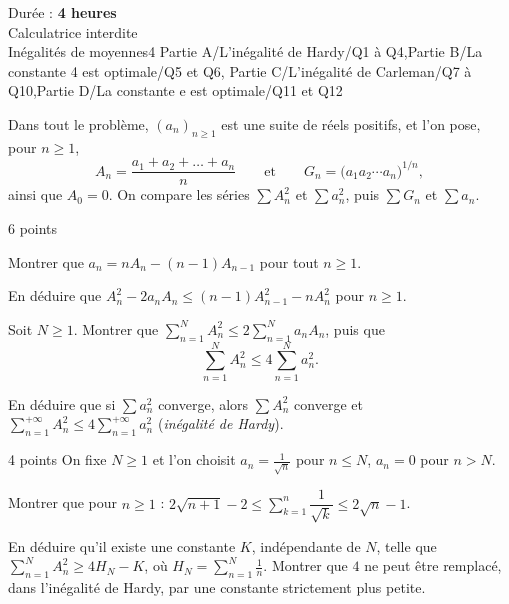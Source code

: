 
  {Durée : \textbf{4 heures}\\Calculatrice interdite\\Inégalités de moyennes}{4}
  {Partie A/L'inégalité de Hardy/Q1 à Q4,Partie B/La constante 4 est optimale/Q5 et Q6,%
   Partie C/L'inégalité de Carleman/Q7 à Q10,Partie D/La constante $\mathrm{e}$ est optimale/Q11 et Q12}
\enParties
{}

Dans tout le problème, $(a_n)_{n\geqslant1}$ est une suite de réels
positifs, et l'on pose, pour $n\geqslant1$,
\[A_n=\frac{a_1+a_2+\dots+a_n}{n}\qquad\text{et}\qquad G_n=\bigl(a_1a_2\cdots a_n\bigr)^{1/n},\]
ainsi que $A_0=0$. On compare les séries $\sum A_n^{2}$ et $\sum a_n^{2}$,
puis $\sum G_n$ et $\sum a_n$.

\begin{exoEval}{6 points}{}
\begin{questions}
  \item Montrer que $a_n=nA_n-(n-1)A_{n-1}$ pour tout $n\geqslant1$.
  \item En déduire que
    $A_n^{2}-2a_nA_n\leqslant(n-1)A_{n-1}^{2}-nA_n^{2}$ pour $n\geqslant1$.
  \item Soit $N\geqslant1$. Montrer que
    $\sum_{n=1}^{N}A_n^{2}\leqslant2\sum_{n=1}^{N}a_nA_n$, puis que
    \[\sum_{n=1}^{N}A_n^{2}\leqslant4\sum_{n=1}^{N}a_n^{2}.\]
  \item En déduire que si $\sum a_n^{2}$ converge, alors $\sum A_n^{2}$
    converge et $\sum_{n=1}^{+\infty}A_n^{2}\leqslant4\sum_{n=1}^{+\infty}a_n^{2}$
    (\emph{inégalité de Hardy}).
\end{questions}
\end{exoEval}

\begin{exoEval}{4 points}{}
On fixe $N\geqslant1$ et l'on choisit $a_n=\frac{1}{\sqrt n}$ pour
$n\leqslant N$, $a_n=0$ pour $n>N$.
\begin{questions}[start=5]
  \item Montrer que pour $n\geqslant1$ :
    $2\sqrt{n+1}-2\leqslant\sum_{k=1}^{n}\dfrac{1}{\sqrt k}\leqslant2\sqrt n-1$.
  \item En déduire qu'il existe une constante $K$, indépendante de $N$,
    telle que $\sum_{n=1}^{N}A_n^{2}\geqslant4H_N-K$, où
    $H_N=\sum_{n=1}^{N}\frac1n$. Montrer que $4$ ne peut être remplacé, dans
    l'inégalité de Hardy, par une constante strictement plus petite.
\end{questions}
\end{exoEval}

